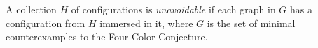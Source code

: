 A collection $H$ of configurations is \textit{unavoidable} if each graph in $G$ has a configuration from $H$ immersed in it, where $G$ is the set of minimal counterexamples to the Four-Color Conjecture.
